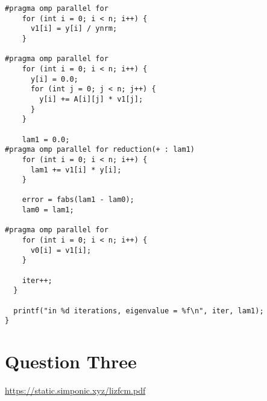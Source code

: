 \documentclass[11pt]{article}
\begin{document}
\begin{verbatim}
#pragma omp parallel for
    for (int i = 0; i < n; i++) {
      v1[i] = y[i] / ynrm;
    }

#pragma omp parallel for
    for (int i = 0; i < n; i++) {
      y[i] = 0.0;
      for (int j = 0; j < n; j++) {
        y[i] += A[i][j] * v1[j];
      }
    }

    lam1 = 0.0;
#pragma omp parallel for reduction(+ : lam1)
    for (int i = 0; i < n; i++) {
      lam1 += v1[i] * y[i];
    }

    error = fabs(lam1 - lam0);
    lam0 = lam1;

#pragma omp parallel for
    for (int i = 0; i < n; i++) {
      v0[i] = v1[i];
    }

    iter++;
  }

  printf("in %d iterations, eigenvalue = %f\n", iter, lam1);
}
\end{verbatim}

\section{Question Three}
\label{sec:org33439e0}
\url{https://static.simponic.xyz/lizfcm.pdf}
\end{document}

